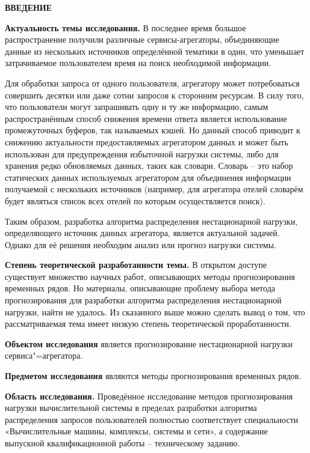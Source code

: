 \documentclass[a4paper,14pt,russian]{extreport}
\newcommand{\empline}{\vspace{1em}}
\newcommand{\likechapterheading}[1]{ 
		\clearpage   
		\begin{center}
		\textbf{\MakeUppercase{#1}}
		\end{center}
	}
\newcommand{\likechapter}[1]{ 
		\likechapterheading{#1}    
		\addtocontents{toc}{\vspace{1em}}
		\addcontentsline{toc}{likechapter}{\MakeUppercase{#1}}
		\empline
	}
\begin{document}
\tableofcontents

\likechapter{Введение}

{\bfseries Актуальность темы исследования.} 
В последнее время большое распространение получили различные 
сервисы-агрегаторы, объединяющие данные из нескольких источников
определённой тематики в один, что уменьшает затрачиваемое пользователем
время на поиск необходимой информации. 

Для обработки запроса от одного пользователя, агрегатору может 
потребоваться совершить десятки или даже сотни запросов к сторонним 
ресурсам. В силу того, что пользователи могут запрашивать одну и ту же 
информацию, самым распространённым способ снижения времени ответа 
является использование промежуточных буферов, так называемых кэшей. Но 
данный способ приводит к снижению актуальности предоставляемых 
агрегатором данных и может быть использован для предупреждения 
избыточной нагрузки системы, либо для хранения редко обновляемых данных, 
таких как словари. Словарь -- это набор статических данных используемых 
агрегатором для объединения информации получаемой с нескольких источников 
(например, для агрегатора отелей словарём будет являться список всех отелей 
по которым осуществляется поиск). 

Таким образом, разработка алгоритма распределения нестационарной нагрузки, 
определяющего источник данных агрегатора, является актуальной задачей. 
Однако для её решения необходим анализ или прогноз нагрузки системы.

{\bfseries Степень теоретической разработанности темы.}
В открытом доступе существует множество научных работ, описывающих 
методы прогнозирования временных рядов. Но материалы, описывающие 
проблему выбора метода прогнозирования для разработки алгоритма 
распределения нестационарной нагрузки, найти не удалось. Из сказанного выше 
можно сделать вывод о том, что рассматриваемая тема имеет низкую степень 
теоретической проработанности.

{\bfseries Объектом исследования} является прогнозирование нестационарной 
нагрузки сервиса"=агрегатора.

{\bfseries Предметом исследования} являются методы прогнозирования 
временных рядов.

{\bfseries Область исследования.} Проведённое исследование методов 
прогнозирования нагрузки вычислительной системы в пределах разработки 
алгоритма распределения запросов пользователей полностью соответствует 
специальности «Вычислительные машины, комплексы, системы и сети», а 
содержание выпускной квалификационной работы -- техническому
заданию.
\end{document}
